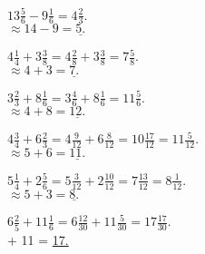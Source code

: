 \documentclass[12pt]{article}
\newenvironment{problem}[2][Problem]{\begin{trivlist}
\item[\hskip \labelsep {\bfseries #1}\hskip \labelsep {\bfseries #2.}]}{\end{trivlist}}
\begin{document}
\begin{problem}{10}
$13 \frac{5}{6} - 9 \frac{1}{6} = \boxed{4 \frac{2}{3}.}$ \\
$\approx 14 - 9 = \underline{5.}$
\end{problem}

\begin{problem}{11}
$4 \frac{1}{4} + 3 \frac{3}{8} = 4 \frac{2}{8} + 3 \frac{3}{8} = \boxed{7 \frac{5}{8}.}$ \\
$\approx 4 + 3 = \underline{7.}$
\end{problem}

\begin{problem}{12}
$3 \frac{2}{3} + 8 \frac{1}{6} = 3 \frac{4}{6} + 8 \frac{1}{6} = \boxed{11 \frac{5}{6}.}$ \\
$\approx 4 + 8 = \underline{12.}$
\end{problem}

\begin{problem}{13}
$4 \frac{3}{4} + 6 \frac{2}{3} = 4 \frac{9}{12} + 6 \frac{8}{12} = 10 \frac{17}{12} = \boxed{11 \frac{5}{12}.}$ \\
$\approx 5 + 6 = \underline{11.}$
\end{problem}

\begin{problem}{14}
$5 \frac{1}{4} + 2 \frac{5}{6} = 5 \frac{3}{12} + 2 \frac{10}{12} = 7 \frac{13}{12} = \boxed{8 \frac{1}{12}.}$ \\
$\approx 5 + 3 = \underline{8.}$
\end{problem}

\begin{problem}{15}
$6 \frac{2}{5} + 11 \frac{1}{6} = 6 \frac{12}{30} + 11 \frac{5}{30} = \boxed{17 \frac{17}{30}.}$ \\
 + 11 = \underline{17.}
\end{problem}
\end{document}
